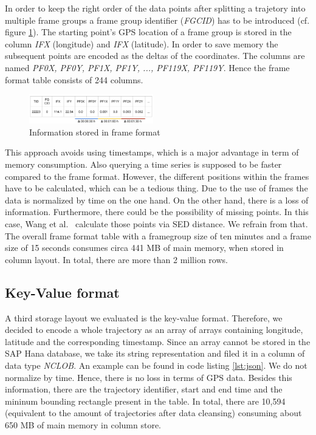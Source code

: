 \documentclass[10pt]{sig-alternate}
\begin{document}
In order to keep the right order of the data points after splitting a trajetory into multiple frame groups a frame group identifier (\textit{FGCID}) has to be introduced (cf. figure \ref{fig:frame_format}). The starting point's GPS location of a frame group is stored in the column \textit{IFX} (longitude) and \textit{IFX} (latitude). In order to save memory the subsequent points are encoded as the deltas of the coordinates. The columns are named \textit{PF0X, PF0Y, PF1X, PF1Y, ..., PF119X, PF119Y}. Hence the frame format table consists of 244 columns.

\begin{figure}[ht]
\centering
\includegraphics[width=0.48\textwidth]{img/frame_format.png}
\caption{Information stored in frame format}
\label{fig:frame_format}
\end{figure}

This approach avoids using timestamps, which is a major advantage in term of memory consumption. Also querying a time series is supposed to be faster compared to the frame format. However, the different positions within the frames have to be calculated, which can be a tedious thing. Due to the use of frames the data is normalized by time on the one hand. On the other hand, there is a loss of information. Furthermore, there could be the possibility of missing points. In this case, Wang et al.~\cite{wang} calculate those points via SED distance. We refrain from that. The overall frame format table with a framegroup size of ten minutes and a frame size of 15 seconds consumes circa 441 MB of main memory, when stored in column layout. In total, there are more than 2 million rows.

\subsection{Key-Value format}

A third storage layout we evaluated is the key-value format. Therefore, we decided to encode a whole trajectory as an array of arrays containing longitude, latitude and the corresponding timestamp. Since an array cannot be stored in the SAP Hana database, we take its string representation and filed it in a column of data type \textit{NCLOB}. An example can be found in code listing \ref{lst:json}. We do not normalize by time. Hence, there is no loss in terms of GPS data. Besides this information, there are the trajectory identifier, start and end time and the mininum bounding rectangle present in the table. In total, there are 10,594 (equivalent to the amount of trajectories after data cleansing) consuming about 650 MB of main memory in column store.
\end{document}
